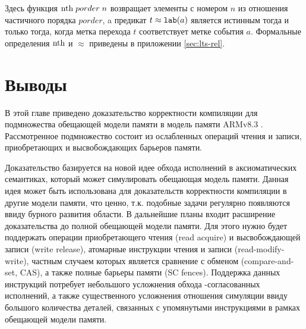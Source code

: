   Здесь функция $\mathrm{nth} \; porder \; n$ возвращает
  элементы с номером $n$ из отношения частичного порядка $porder$, 
  a предикат $t \approx {\mathtt{lab}}(a)$ является истинным тогда и только тогда, когда метка перехода $t$
  соответствует метке события $a$.
  Формальные определения  $\mathrm{nth}$ и $\approx$ приведены в приложении \ref{sec:lts-rel}.
\section{Выводы}
В этой главе приведено доказательство корректности компиляции для подмножества
обещающей модели памяти \cite{Kang-al:POPL17} в модель памяти ARMv8.3 \cite{Pulte-al:POPL18}.
Рассмотренное подмножество состоит из ослабленных операций чтения и записи, приобретающих и высвобождающих барьеров памяти. 

Доказательство базируется на новой идее обхода исполнений в аксиоматических
семантиках, который может симулировать обещающая модель памяти. 
Данная идея может быть использована для доказательств
корректности компиляции в другие модели памяти, что ценно, т.к. подобные задачи регулярно появляются
ввиду бурного развития области.
В дальнейшие планы входит расширение доказательства
до полной обещающей модели памяти. Для этого нужно будет поддержать операции
приобретающего чтения (read acquire) и высвобождающей записи (write release),
атомарные инструкции чтения и записи (read-modify-write), частным случаем которых
является сравнение с обменом (compare-and-set, CAS), а также полные барьеры памяти (SC fences).
Поддержка данных инструкций потребует небольшого усложнения обхода \ARM-согласованных
исполнений, а также существенного усложнения отношения симуляции ввиду большого количества деталей,
связанных с упомянутыми инструкциями в рамках обещающей модели памяти.
